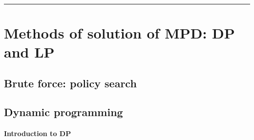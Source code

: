 \documentclass[letterpaper,10pt,english]{jupyterBook}
\begin{document}
\bigskip\hrule\bigskip


\sphinxstepscope


\chapter{Methods of solution of MPD: DP and LP}
\label{\detokenize{ch/rl/mdp_sol_dp_lp:methods-of-solution-of-mpd-dp-and-lp}}\label{\detokenize{ch/rl/mdp_sol_dp_lp:rl-mdp-sol-dp-lp}}\label{\detokenize{ch/rl/mdp_sol_dp_lp::doc}}

\section{Brute force: policy search}
\label{\detokenize{ch/rl/mdp_sol_dp_lp:brute-force-policy-search}}

\section{Dynamic programming}
\label{\detokenize{ch/rl/mdp_sol_dp_lp:dynamic-programming}}\label{\detokenize{ch/rl/mdp_sol_dp_lp:rl-mdp-sol-dp}}\subsubsection*{Introduction to DP}
\end{document}
